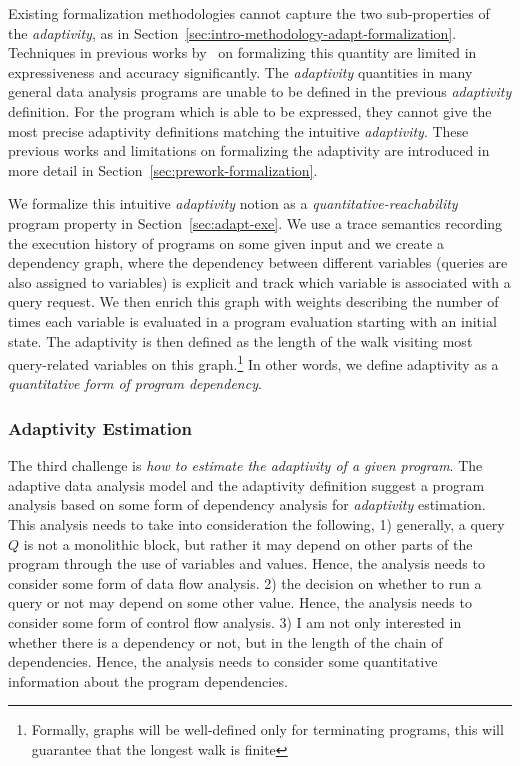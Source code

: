 Existing formalization methodologies cannot
capture the two sub-properties of the \emph{adaptivity}, as in Section~\ref{sec:intro-methodology-adapt-formalization}.
Techniques in previous works by~\cite{weihao22} on formalizing this quantity
are limited in expressiveness and accuracy significantly.
The \emph{adaptivity} quantities in many general data analysis programs are unable to be defined in the previous \emph{adaptivity} definition.
For the program which is able to be expressed,
they cannot give the most precise adaptivity definitions matching the intuitive \emph{adaptivity}.
These previous works and limitations on formalizing the adaptivity are introduced in more detail in Section~\ref{sec:prework-formalization}.

We formalize this intuitive \emph{adaptivity} notion as a \emph{quantitative-reachability} program property 
in Section~\ref{sec:adapt-exe}. 
We use a trace semantics recording the execution history of programs on some given input and we create a dependency graph, where the dependency between different variables (queries are also assigned to variables) is explicit and track which variable is associated with a query request. We then enrich this graph with weights describing the number of times each variable is evaluated in a program evaluation starting with an initial state. The adaptivity is then defined as the length of the walk visiting most query-related variables on this graph.\footnote{Formally, graphs will be well-defined only for terminating programs, this will guarantee that the longest walk is finite} In other words, we define adaptivity as a \emph{quantitative form of program dependency}.

\subsubsection{Adaptivity Estimation}

The third challenge is \emph{how to estimate the adaptivity of a given program}. 
The adaptive data analysis model and the adaptivity definition suggest
a program analysis
based on some form of dependency analysis for \emph{adaptivity} estimation.
 This analysis needs to take into consideration the following,
1) generally, a query $Q$ is not a monolithic block, but rather it may depend on other parts of the program through the use of variables and values. 
Hence, the analysis needs to consider some form of data flow analysis. 
2) the decision on whether to run a query or not may depend on some other value. Hence, 
the analysis  needs to consider some form of control flow analysis.
3) I am not only interested in whether there is a dependency or not, but in the length of the chain of dependencies. 
Hence, the analysis needs to consider some quantitative information about the program dependencies. 

